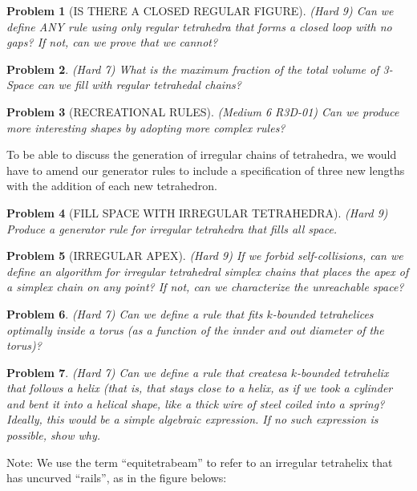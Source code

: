 \documentclass[11pt]{article}
\newtheorem{problem}{Problem}
\begin{document}
\begin{problem}[IS THERE A CLOSED REGULAR FIGURE]
(Hard 9) Can we define ANY rule using only regular tetrahedra that forms a closed loop with no gaps? If not, can we prove that we cannot?  
\end{problem}


\begin{problem}
(Hard 7) What is the maximum fraction of the total volume of 3-Space can we fill with regular tetrahedal chains?
\end{problem}

\begin{problem}[RECREATIONAL RULES]
(Medium 6 R3D-01) Can we produce more interesting shapes by adopting more complex rules?  
\end{problem}

To be able to discuss the generation of irregular chains of tetrahedra, we would have to amend our generator rules to include a specification
of three new lengths with the addition of each new tetrahedron.

\begin{problem}[FILL SPACE WITH IRREGULAR TETRAHEDRA]
(Hard 9) Produce a generator rule for irregular tetrahedra that fills all space.
\end{problem}

\begin{problem}[IRREGULAR APEX]
  (Hard 9) If we forbid self-collisions, can we define an algorithm for irregular tetrahedral simplex chains that places the apex
  of a simplex chain on any point? If not, can we characterize the unreachable space?
\end{problem}

\begin{problem}
(Hard 7) Can we define a rule that fits $k$-bounded tetrahelices optimally inside a torus (as a function of the innder and out diameter of the torus)?  
\end{problem}

\begin{problem}
\item (Hard 7) Can we define a rule that createsa $k$-bounded tetrahelix that follows a helix (that is, that stays close to a helix, as if we took a cylinder and bent it into a helical shape, like a thick wire of
steel coiled into a spring? Ideally, this would be a simple algebraic expression. If no such expression is possible, show why.
\end{problem}

Note: We use the term ``equitetrabeam'' to refer to an irregular tetrahelix that has uncurved ``rails'', as in the figure belows:
\end{document}
